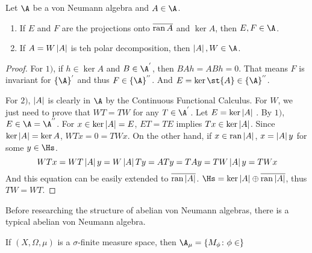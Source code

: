 \begin{prop}
	Let $\A$ be a von Neumann algebra and $A \in \A$.
	\begin{enumerate}[label=\arabic*)]
		\item If $E$ and $F$ are the projections onto $\overline{\operatorname{ran}{A}}$ and $\ker{A}$, then $E,F \in \A$.
		\item If $A = W\left\lvert A\right\lvert$ is teh polar decomposition, then $\abs{A},W \in \A$.
	\end{enumerate}
\end{prop}
\begin{proof}
	For $1)$, if $h \in \ker{A}$ and $B \in \A^{'}$, then $BAh = ABh = 0$. That means $F$ is invariant for $\{\A\}^{'}$ and thus $F \in \{\A\}^{''}$. And $E = \ker{\st{A}} \in \{\A\}^{''}$.
	\item For $2)$, $\left\lvert A\right\lvert$ is clearly in $\A$ by the Continuous Functional Calculus. For $W$, we just need to prove that $WT=TW$ for any $T \in \A^{'}$. Let $E = \ker{\left\lvert A\right\lvert}$ . By $1)$, $E \in \A = \A^{''}$. For $x \in \ker{\left\lvert A\right\lvert} = E$, $ET=TE$ implies $Tx \in \ker{\left\lvert A\right\lvert}$. Since $\ker{\left\lvert A\right\lvert} = \ker{A}$, $WTx =0 = TWx$. On the other hand, if $x \in \operatorname{ran}{\left\lvert A\right\lvert}$, $x = \left\lvert A\right\lvert y$ for some $y \in \Hs$.
	\begin{equation*}
		WTx = WT\left\lvert A\right\lvert y = W\left\lvert A\right\lvert Ty = ATy= TAy = TW\left\lvert A\right\lvert y = TWx
	\end{equation*} 
	And this equation can be easily extended to $\overline{\operatorname{ran}{\left\lvert A\right\lvert}}$. $\Hs = \ker{\abs{A}} \oplus \clo{\ran{\abs{A}}}$, thus $TW=WT$.
\end{proof}

Before researching the structure of abelian von Neumann algebras, there is a typical abelian von Neumann algebra.
\begin{exam}
	If $(X,\Omega,\mu)$ is a $\sigma$-finite measure space, then $\A_{\mu} = \{M_{\phi} \colon \phi \in \}$
\end{exam}
















